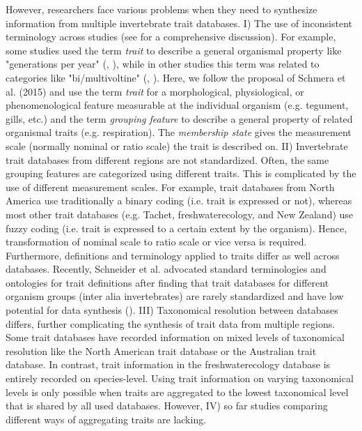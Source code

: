 \documentclass{article}
\begin{document}
However, researchers face various problems when they need to synthesize information from multiple invertebrate trait databases. 
I) The use of inconsistent terminology across studies (see \cite{schmera_proposed_2015} for a comprehensive discussion). 
For example, some studies used the term \textit{trait} to describe a general organismal property like "generations per year" (\cite{statzner_reproductive_1997}, \cite{ussegliopolatera_biological_2000}), while in other studies this 
term was related to categories like "bi/multivoltine" (\cite{haybach_use_2004}, \cite{vieira_database_nodate}). Here, we follow 
the proposal of Schmera et al. (2015) and use the term \textit{trait} for a morphological, physiological, or phenomenological feature measurable at the individual organism (e.g. tegument, gills, etc.) and the term \textit{grouping feature} to describe a general property of related organismal traits (e.g. respiration). The \textit{membership state} gives the measurement scale (normally nominal or ratio scale) the trait is described on.
II) Invertebrate trait databases from different regions are not standardized. Often, the same grouping features are categorized using different traits. 
This is complicated by the use of different measurement scales. For example, trait databases from North America use traditionally a binary coding (i.e. trait is expressed or not), whereas most other trait databases (e.g. Tachet, freshwaterecology, and New Zealand) use fuzzy coding (i.e. trait is expressed to a certain extent by the organism). Hence, transformation of nominal scale to ratio scale or vice versa is required. %
Furthermore, definitions and terminology applied to traits differ as well across databases. Recently, Schneider et al. advocated standard terminologies and ontologies for trait definitions after finding that trait databases for different organism groups (inter alia invertebrates) are rarely standardized and have low potential for data synthesis (\cite{schneider_towards_2019}).
III) Taxonomical resolution between databases differs, further complicating the synthesis of trait data from multiple regions. Some trait databases have recorded information on mixed levels of taxonomical resolution like the North American trait database or the Australian trait database. In contrast, trait information in the freshwaterecology database is entirely recorded on species-level. %
Using trait information on varying taxonomical levels is only possible when traits are aggregated to the lowest taxonomical level that is shared by all used databases. However, IV) so far studies comparing different ways of aggregating traits are lacking.
\end{document}
